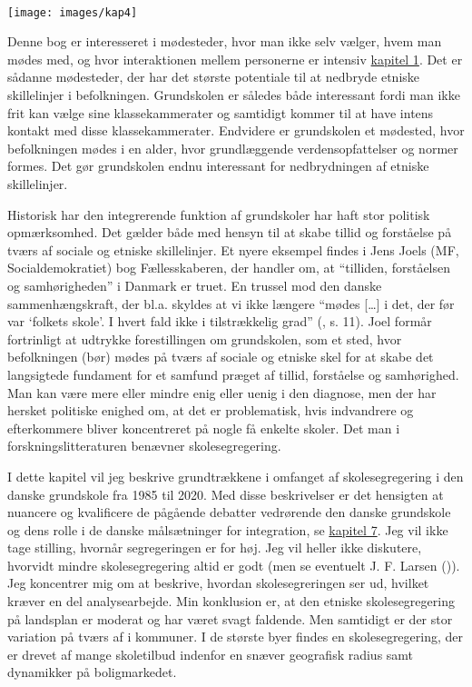 \documentclass[
]{book}
\begin{document}
~~~~

\texttt{[image: images/kap4]}

\newpage

Denne bog er interesseret i mødesteder, hvor man ikke selv vælger, hvem man mødes med, og hvor interaktionen mellem personerne er intensiv \hyperref[kap1]{kapitel 1}. Det er sådanne mødesteder, der har det største potentiale til at nedbryde etniske skillelinjer i befolkningen. Grundskolen er således både interessant fordi man ikke frit kan vælge sine klassekammerater og samtidigt kommer til at have intens kontakt med disse klassekammerater. Endvidere er grundskolen et mødested, hvor befolkningen mødes i en alder, hvor grundlæggende verdensopfattelser og normer formes. Det gør grundskolen endnu interessant for nedbrydningen af etniske skillelinjer.

Historisk har den integrerende funktion af grundskoler har haft stor politisk opmærksomhed. Det gælder både med hensyn til at skabe tillid og forståelse på tværs af sociale og etniske skillelinjer. Et nyere eksempel findes i Jens Joels (MF, Socialdemokratiet) bog Fællesskaberen, der handler om, at ``tilliden, forståelsen og samhørigheden'' i Danmark er truet. En trussel mod den danske sammenhængskraft, der bl.a. skyldes at vi ikke længere ``mødes {[}\ldots{]} i det, der før var `folkets skole'. I hvert fald ikke i tilstrækkelig grad'' (, s. 11). Joel formår fortrinligt at udtrykke forestillingen om grundskolen, som et sted, hvor befolkningen (bør) mødes på tværs af sociale og etniske skel for at skabe det langsigtede fundament for et samfund præget af tillid, forståelse og samhørighed. Man kan være mere eller mindre enig eller uenig i den diagnose, men der har hersket politiske enighed om, at det er problematisk, hvis indvandrere og efterkommere bliver koncentreret på nogle få enkelte skoler. Det man i forskningslitteraturen benævner skolesegregering.

I dette kapitel vil jeg beskrive grundtrækkene i omfanget af skolesegregering i den danske grundskole fra 1985 til 2020. Med disse beskrivelser er det hensigten at nuancere og kvalificere de pågående debatter vedrørende den danske grundskole og dens rolle i de danske målsætninger for integration, se \hyperref[kap7]{kapitel 7}. Jeg vil ikke tage stilling, hvornår segregeringen er for høj. Jeg vil heller ikke diskutere, hvorvidt mindre skolesegregering altid er godt (men se eventuelt J. F. Larsen ()). Jeg koncentrer mig om at beskrive, hvordan skolesegreringen ser ud, hvilket kræver en del analysearbejde. Min konklusion er, at den etniske skolesegregering på landsplan er moderat og har været svagt faldende. Men samtidigt er der stor variation på tværs af i kommuner. I de største byer findes en skolesegregering, der er drevet af mange skoletilbud indenfor en snæver geografisk radius samt dynamikker på boligmarkedet.
\end{document}
